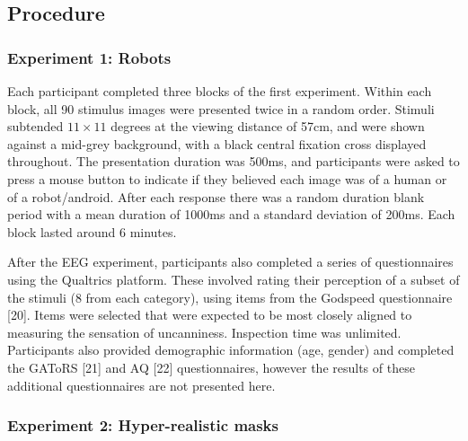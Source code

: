 \documentclass[
]{article}
\begin{document}
\subsection{Procedure}\label{procedure}

\subsubsection{Experiment 1: Robots}\label{experiment-1-robots}

Each participant completed three blocks of the first experiment. Within each block, all 90 stimulus images were presented twice in a random order. Stimuli subtended \(11\times11\) degrees at the viewing distance of 57cm, and were shown against a mid-grey background, with a black central fixation cross displayed throughout. The presentation duration was 500ms, and participants were asked to press a mouse button to indicate if they believed each image was of a human or of a robot/android. After each response there was a random duration blank period with a mean duration of 1000ms and a standard deviation of 200ms. Each block lasted around 6 minutes.

After the EEG experiment, participants also completed a series of questionnaires using the Qualtrics platform. These involved rating their perception of a subset of the stimuli (8 from each category), using items from the Godspeed questionnaire {[}20{]}. Items were selected that were expected to be most closely aligned to measuring the sensation of uncanniness. Inspection time was unlimited. Participants also provided demographic information (age, gender) and completed the GAToRS {[}21{]} and AQ {[}22{]} questionnaires, however the results of these additional questionnaires are not presented here.

\subsubsection{Experiment 2: Hyper-realistic masks}\label{experiment-2-hyper-realistic-masks}
\end{document}

